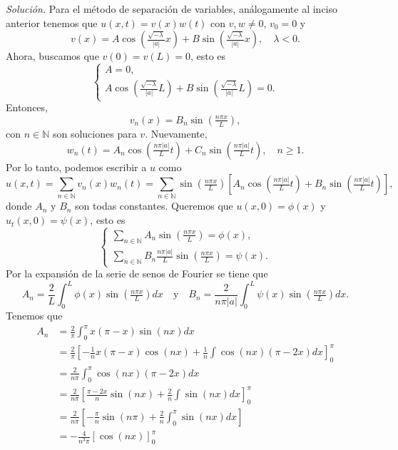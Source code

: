 \documentclass[12pt]{article}
\newcommand{\sol}{\textit{Solución. }}
\newcommand{\N}{\mathbb{N}}
\newcommand{\pp}[1]{\left( #1 \right)}
\newcommand{\cc}[1]{\left[ #1 \right]}
\newcommand{\Text}[1]{\quad\text{#1}\quad}
\renewcommand{\l}{\lambda}
\begin{document}
\begin{enumerate}
\begin{enumerate}
            \sol Para el método de separación de variables, análogamente al inciso anterior tenemos que $u(x,t)=v(x)w(t)$ con $v,w\neq 0$, $v_0=0$ y 
            \[ v(x)=A\cos\pp{\tfrac{\sqrt{-\l}}{|a|}x}+B\sin\pp{\tfrac{\sqrt{-\l}}{|a|}x},\quad\l<0. \]
            Ahora, buscamos que $v(0)=v(L)=0$, esto es
            \[
            \begin{cases}
                A=0,\\
                A\cos\pp{\tfrac{\sqrt{-\l}}{|a|}L}+B\sin\pp{\tfrac{\sqrt{-\l}}{|a|}L}=0.
            \end{cases}
            \]
            Entonces,
            \[ v_n(x)= B_n\sin\pp{\tfrac{n\pi x}{L}}, \]
            con $n\in\N$ son soluciones para $v$.
            Nuevamente,
            \[ w_n(t)= A_n\cos\pp{\tfrac{n\pi |a|}{L}t}+ C_n\sin\pp{\tfrac{n\pi |a|}{L}t},\quad n\geq 1. \]
            Por lo tanto, podemos escribir a $u$ como
            \[ u(x,t)=\sum_{n\in\N}v_n(x)w_n(t)=\sum_{n\in\N}\sin\pp{\tfrac{n\pi x}{L}}\cc{A_n\cos\pp{\tfrac{n\pi |a|}{L}t}+ B_n\sin\pp{\tfrac{n\pi |a|}{L}t}}, \]
            donde $A_n$ y $B_n$ son todas constantes. Queremos que $u(x,0)=\phi(x)$ y $u_t(x,0) = \psi(x)$, esto es
            \[
            \begin{cases}
                \sum_{n\in\N} A_n\sin\pp{\tfrac{n\pi x}{L}} = \phi(x),\\
                \sum_{n\in\N} B_n\tfrac{n\pi|a|}{L}\sin\pp{\tfrac{n\pi x}{L}} = \psi(x).
            \end{cases}
            \]
            Por la expansión de la serie de senos de Fourier se tiene que
            \[ A_n = \frac{2}{L}\int_0^{L}\phi(x)\sin\pp{\tfrac{n\pi x}{L}}dx\Text{y}B_n= \frac{2}{n\pi|a|}\int_0^{L}\psi(x)\sin\pp{\tfrac{n\pi x}{L}}dx.\]
            Tenemos que
            \begin{align*}
                A_n &= \frac{2}{\pi}\int_0^{\pi}x(\pi-x)\sin\pp{n x}dx\\
                &= \frac{2}{\pi}\cc{-\tfrac{1}{n}x(\pi-x)\cos(nx)+\tfrac{1}{n}\int\cos(nx)(\pi-2x)dx}_0^\pi\\
                &= \frac{2}{n\pi}\int_0^\pi\cos(nx)(\pi-2x)dx\\
                &= \frac{2}{n\pi}\cc{\tfrac{\pi-2x}{n}\sin(nx)+\tfrac{2}{n}\int\sin(nx)dx}_0^\pi\\
                &= \frac{2}{n\pi}\cc{-\tfrac{\pi}{n}\sin(n\pi)+\tfrac{2}{n}\int_0^\pi\sin(nx)dx}\\
                &= -\frac{4}{n^3\pi}\cc{\cos(nx)}_0^\pi\\

\end{align*}
\end{enumerate}
\end{enumerate}
\end{document}
